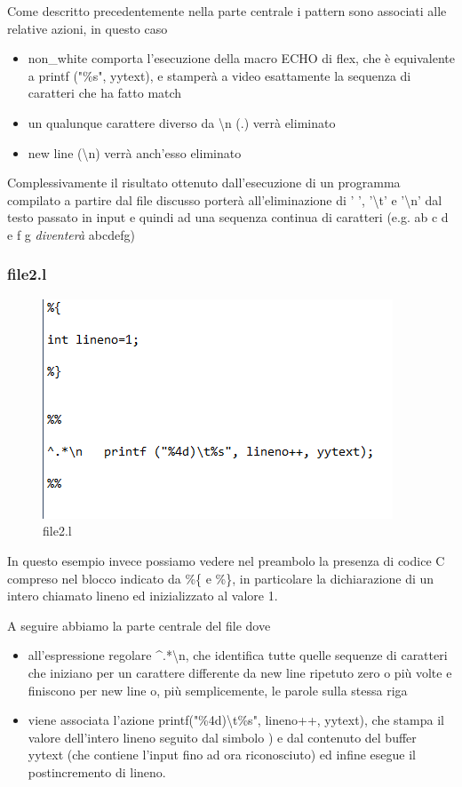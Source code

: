 \documentclass[class=book, crop=false, oneside, 12pt]{standalone}
\begin{document}
Come descritto precedentemente nella parte centrale i pattern sono associati alle relative azioni, in questo caso
\begin{itemize}
    \item non\_white comporta l'esecuzione della macro ECHO di flex, che è equivalente a  printf ("\%s", yytext), e stamperà a video esattamente la sequenza di caratteri che ha fatto match
    \item un qualunque carattere diverso da \textbackslash n (.) verrà eliminato
    \item new line (\textbackslash n) verrà anch'esso eliminato
\end{itemize}

Complessivamente il risultato ottenuto dall'esecuzione di un programma compilato a partire dal file discusso porterà all'eliminazione di ' ', '\textbackslash t' e '\textbackslash n' dal testo passato in input e quindi ad una sequenza continua di caratteri (e.g. ab c d e      f g \emph{diventerà} abcdefg)

\subsubsection{file2.l}

\begin{figure}[h]
    \centering
    \includegraphics[width=.7\textwidth,keepaspectratio]{file2.l.png}
    \caption{file2.l}
    \label{file2.l}
\end{figure}

In questo esempio invece possiamo vedere nel preambolo la presenza di codice C compreso nel blocco indicato da \%\{ e \%\}, in particolare la dichiarazione di un intero chiamato lineno ed inizializzato al valore 1.

A seguire abbiamo la parte centrale del file dove 

\begin{itemize}
    \item all'espressione regolare \^{}.*\textbackslash n, che identifica tutte quelle sequenze di caratteri che iniziano per un carattere differente da new line ripetuto zero o più volte e finiscono per new line o, più semplicemente, le parole sulla stessa riga
    \item  viene associata l'azione printf("\%4d)\textbackslash t\%s", lineno++, yytext), che stampa il valore dell'intero lineno seguito dal simbolo ) e dal contenuto del buffer yytext (che contiene l'input fino ad ora riconosciuto) ed infine esegue il postincremento di lineno.
\end{itemize}
\end{document}
